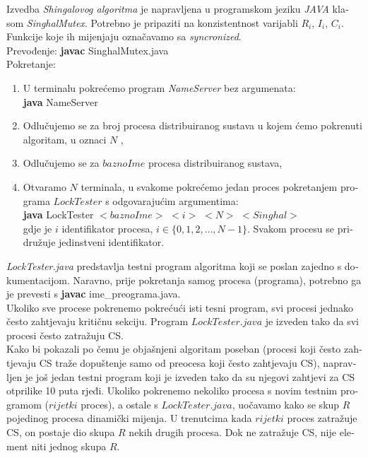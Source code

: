 \documentclass[12pt]{rectors}
\begin{document}
\begin{otherlanguage}{croatian}
Izvedba \textit{Shingalovog algoritma} je napravljena u programskom jeziku \textit{JAVA} klasom \textit{SinghalMutex}.
Potrebno je pripaziti na konzistentnost varijabli $R_i$, $I_i$, $C_i$.
Funkcije koje ih mijenjaju označavamo sa \textit{syncronized}.
\vspace{0.5cm}
\\Prevođenje: \textbf{javac} SinghalMutex.java\\
Pokretanje: %
\begin{enumerate}
	\item U terminalu pokrećemo program \textit{NameServer} bez argumenata:\\
	 \textbf{java} NameServer
	 \item Odlučujemo se za broj procesa distribuiranog sustava u kojem ćemo pokrenuti 
	 algoritam, u oznaci $N$ ,
	 \item Odlučujemo se za $baznoIme$ procesa distribuiranog sustava,
	 \item Otvaramo $N$ terminala, u svakome pokrećemo jedan proces pokretanjem programa
	 $LockTester$ s odgovarajućim argumentima:\\
	 \textbf{java} LockTester $<baznoIme>$ $<i>$ $<N>$ $<Singhal>$
	 \vspace{0.2cm}
	 \\gdje je $i$ identifikator procesa, $i \in \{ 0,1,2,\hdots,N-1 \}$. 
	 Svakom procesu se pridružuje jedinstveni identifikator.
\end{enumerate}
\textit{LockTester.java} predstavlja testni program algoritma koji se poslan zajedno s dokumentacijom. Naravno, prije pokretanja samog procesa (programa), potrebno ga je prevesti s \textbf{javac} ime\_preograma.java.
\vspace{0.5cm}
\\Ukoliko sve procese pokrenemo pokrećući isti tesni program, svi procesi jednako često zahtjevaju kritičnu sekciju. Program $LockTester.java$ je izveden tako da svi procesi često zatražuju CS. 
\\Kako bi pokazali po čemu je objašnjeni algoritam poseban (procesi koji često zahtjevaju CS traže dopuštenje samo od preocesa koji često zahtjevaju CS), napravljen je još jedan testni program koji je izveden tako da su njegovi zahtjevi za CS otprilike 10 puta rjeđi. Ukoliko pokrenemo nekoliko procesa s novim testnim programom ($rijetki$ proces), a ostale s $LockTester.java$, uočavamo kako se skup $R$ pojedinog procesa dinamički mijenja.
U trenutcima kada $rijetki$ proces zatražuje CS, on postaje dio skupa $R$ nekih drugih procesa. Dok ne zatražuje CS, nije element niti jednog skupa $R$.


\end{otherlanguage}
\end{document}
